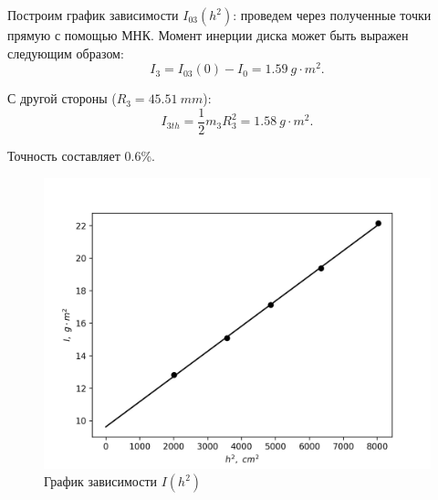 \documentclass[14pt, a4paper]{article}
\begin{document}
\begin{enumerate}
Построим график зависимости $I_{03}(h^2)$: проведем через полученные точки прямую с помощью МНК. Момент инерции диска может быть выражен следующим образом: 
\[I_3=I_{03}(0)-I_{0}=1.59\ g\cdot m^2.\]

С другой стороны ($R_3=45.51\ mm$):
\[I_{3th}=\frac{1}{2}m_3R_3^2=1.58\ g\cdot m^2.\]

Точность составляет 0.6\%.



\begin{figure}[h]
\includegraphics[width=\linewidth]{laba4_1.png}
\caption{График зависимости $I(h^2)$}
\label{image1}
\end{figure}

\end{enumerate}
\end{document}

